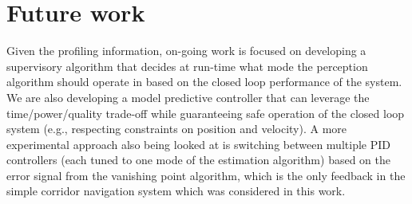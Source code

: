 \section{Future work}

Given the profiling information, on-going work is focused on developing a supervisory algorithm that decides at run-time what mode the perception algorithm should operate in based on the closed loop performance of the system. 
We are also developing a model predictive controller that can leverage the time/power/quality trade-off while guaranteeing safe operation of the closed loop system (e.g., respecting constraints on position and velocity). A more experimental approach also being looked at is switching between multiple PID controllers (each tuned to one mode of the estimation algorithm) based on the error signal from the vanishing point algorithm, which is the only feedback in the simple corridor navigation system which was considered in this work.
